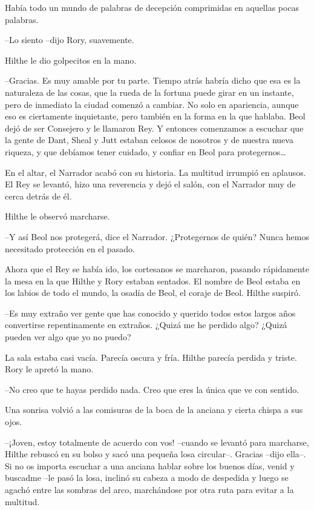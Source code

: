 {Había todo un mundo de palabras de decepción comprimidas en aquellas
pocas palabras.}

{--Lo siento --dijo Rory, suavemente.}

{Hilthe le dio golpecitos en la mano.}

{--Gracias. Es muy amable por tu parte. Tiempo atrás habría dicho que
	esa es la naturaleza de las cosas, que la rueda de la fortuna puede
	girar en un instante, pero de inmediato la ciudad comenzó a cambiar. No
	solo en apariencia, aunque eso es ciertamente inquietante, pero también
	en la forma en la que hablaba. Beol dejó de ser Consejero y le llamaron
	Rey. Y entonces comenzamos a escuchar que la gente de Dant, Sheal y Jutt
	estaban celosos de nosotros y de nuestra nueva riqueza, y que debíamos
	tener cuidado, y confiar en Beol para protegernos\ldots{}}

{En el altar, el Narrador acabó con su historia. La multitud irrumpió en
	aplausos. El Rey se levantó, hizo una reverencia y dejó el salón, con el
Narrador muy de cerca detrás de él.}

{Hilthe le observó marcharse.}

{--Y así Beol nos protegerá, dice el Narrador. ¿Protegernos de quién?
Nunca hemos necesitado protección en el pasado.}

{Ahora que el Rey se había ido, los cortesanos se marcharon, pasando
	rápidamente la mesa en la que Hilthe y Rory estaban sentados. El nombre
	de Beol estaba en los labios de todo el mundo, la osadía de Beol, el
coraje de Beol. Hilthe suspiró.}

{--Es muy extraño ver gente que has conocido y querido todos estos
	largos años convertirse repentinamente en extraños. ¿Quizá me he perdido
algo? ¿Quizá pueden ver algo que yo no puedo?}

{La sala estaba casi vacía. Parecía oscura y fría. Hilthe parecía
perdida y triste. Rory le apretó la mano.}

{--No creo que te hayas perdido nada. Creo que eres la única que ve
con sentido.}

{Una sonrisa volvió a las comisuras de la boca de la anciana y cierta
chispa a sus ojos.}

{--¡Joven, estoy totalmente de acuerdo con vos! --cuando se levantó
	para marcharse, Hilthe rebuscó en su bolso y sacó una pequeña losa
	circular--. Gracias --dijo ella--. Si no os importa escuchar a una
	anciana hablar sobre los buenos días, venid y buscadme --le pasó la
	losa, inclinó su cabeza a modo de despedida y luego se agachó entre las
sombras del arco, marchándose por otra ruta para evitar a la multitud.}


